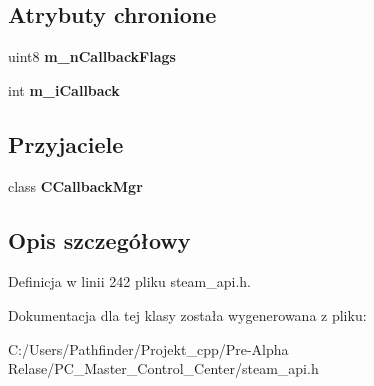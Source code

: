 \subsection*{Atrybuty chronione}
\begin{DoxyCompactItemize}
\item 
\mbox{\label{class_c_callback_base_a9c16a2ed94511f8f0a6e6ee109d62f79}} 
uint8 {\bfseries m\+\_\+n\+Callback\+Flags}
\item 
\mbox{\label{class_c_callback_base_a1928fd70dabcb4670d5b0cb997a0b5ae}} 
int {\bfseries m\+\_\+i\+Callback}
\end{DoxyCompactItemize}
\subsection*{Przyjaciele}
\begin{DoxyCompactItemize}
\item 
\mbox{\label{class_c_callback_base_a20494e55ab44556a1b9d15277289c442}} 
class {\bfseries C\+Callback\+Mgr}
\end{DoxyCompactItemize}


\subsection{Opis szczegółowy}


Definicja w linii 242 pliku steam\+\_\+api.\+h.



Dokumentacja dla tej klasy została wygenerowana z pliku\+:\begin{DoxyCompactItemize}
\item 
C\+:/\+Users/\+Pathfinder/\+Projekt\+\_\+cpp/\+Pre-\/\+Alpha Relase/\+P\+C\+\_\+\+Master\+\_\+\+Control\+\_\+\+Center/steam\+\_\+api.\+h\end{DoxyCompactItemize}
